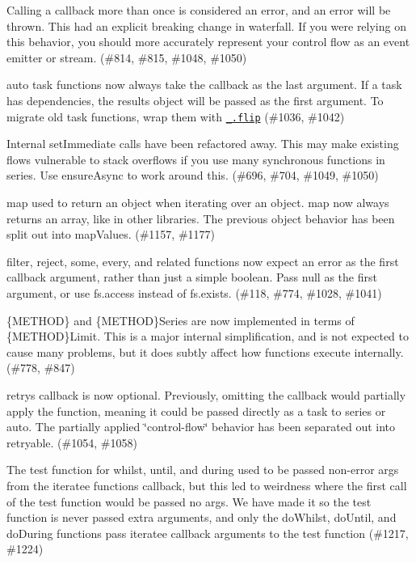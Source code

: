 \begin{DoxyItemize}
\item Calling a callback more than once is considered an error, and an error will be thrown. This had an explicit breaking change in {\ttfamily waterfall}. If you were relying on this behavior, you should more accurately represent your control flow as an event emitter or stream. (\#814, \#815, \#1048, \#1050)
\item {\ttfamily auto} task functions now always take the callback as the last argument. If a task has dependencies, the {\ttfamily results} object will be passed as the first argument. To migrate old task functions, wrap them with \href{https://lodash.com/docs#flip}{\tt {\ttfamily \+\_\+.\+flip}} (\#1036, \#1042)
\item Internal {\ttfamily set\+Immediate} calls have been refactored away. This may make existing flows vulnerable to stack overflows if you use many synchronous functions in series. Use {\ttfamily ensure\+Async} to work around this. (\#696, \#704, \#1049, \#1050)
\item {\ttfamily map} used to return an object when iterating over an object. {\ttfamily map} now always returns an array, like in other libraries. The previous object behavior has been split out into {\ttfamily map\+Values}. (\#1157, \#1177)
\item {\ttfamily filter}, {\ttfamily reject}, {\ttfamily some}, {\ttfamily every}, and related functions now expect an error as the first callback argument, rather than just a simple boolean. Pass {\ttfamily null} as the first argument, or use {\ttfamily fs.\+access} instead of {\ttfamily fs.\+exists}. (\#118, \#774, \#1028, \#1041)
\item {\ttfamily \{M\+E\+T\+H\+OD\}} and {\ttfamily \{M\+E\+T\+H\+OD\}Series} are now implemented in terms of {\ttfamily \{M\+E\+T\+H\+OD\}Limit}. This is a major internal simplification, and is not expected to cause many problems, but it does subtly affect how functions execute internally. (\#778, \#847)
\item {\ttfamily retry}\textquotesingle{}s callback is now optional. Previously, omitting the callback would partially apply the function, meaning it could be passed directly as a task to {\ttfamily series} or {\ttfamily auto}. The partially applied \char`\"{}control-\/flow\char`\"{} behavior has been separated out into {\ttfamily retryable}. (\#1054, \#1058)
\item The test function for {\ttfamily whilst}, {\ttfamily until}, and {\ttfamily during} used to be passed non-\/error args from the iteratee function\textquotesingle{}s callback, but this led to weirdness where the first call of the test function would be passed no args. We have made it so the test function is never passed extra arguments, and only the {\ttfamily do\+Whilst}, {\ttfamily do\+Until}, and {\ttfamily do\+During} functions pass iteratee callback arguments to the test function (\#1217, \#1224)

\end{DoxyItemize}
